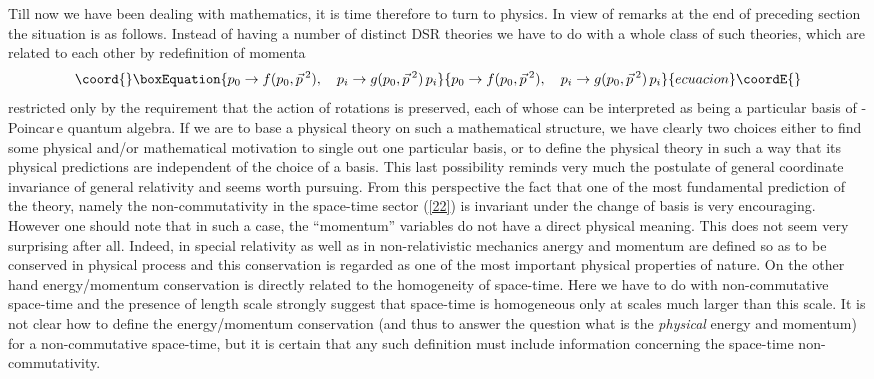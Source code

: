 \documentclass[a4paper,a4paper]{article}
\begin{document}
Till now we have been dealing with mathematics, it is time
therefore to turn to physics. In view of remarks at the end of
preceding section the situation is as follows. Instead of having a
number of distinct DSR theories we have to do with a whole class
of such theories, which are related to each other by redefinition
of momenta
\begin{equation}\coord{}\boxEquation{\label{23}
  p_0 \rightarrow f(p_0, \vec{p}\, {}^2), \quad p_i \rightarrow g(p_0, \vec{p}\,
  {}^2)\, p_i
}{p_0 \rightarrow f(p_0, \vec{p}\, {}^2), \quad p_i \rightarrow g(p_0, \vec{p}\,
  {}^2)\, p_i
}{ecuacion}\coordE{}\end{equation}
 restricted only by the requirement that the action of
rotations is preserved, each of whose can be interpreted as being
a particular basis of \myHighlight{$\kappa$}\coordHE{}-Poincar\,e quantum algebra. If we
are to base a physical theory on such a mathematical structure, we
have clearly two choices either to find some physical and/or
mathematical motivation to single out one particular basis, or to
define the physical theory in such a way that its physical
predictions are independent of the choice of a basis. This last
possibility reminds very much the postulate of general coordinate
invariance of general relativity and seems worth pursuing. From
this perspective the fact that one of the most fundamental
prediction of the theory, namely the non-commutativity in the
space-time sector (\ref{22}) is invariant under the change of
basis is very encouraging. However one  should note that in such a
case, the ``momentum'' variables do not have a direct physical
meaning. This does not seem very surprising after all. Indeed, in
special relativity as well as in non-relativistic mechanics anergy
and momentum are defined so as to be conserved in physical process
and this conservation is regarded as one of the most important
physical properties of nature. On the other hand energy/momentum
conservation is directly related to the homogeneity of space-time.
Here we have to do with non-commutative space-time and the
presence of length scale strongly suggest that space-time is
homogeneous only at scales much larger than this scale. It is not
clear how to define the energy/momentum conservation (and thus to
answer the question what is the {\em physical} energy and
momentum) for a non-commutative space-time, but it is certain that
any such definition must include information concerning the
space-time non-commutativity.
\end{document}
